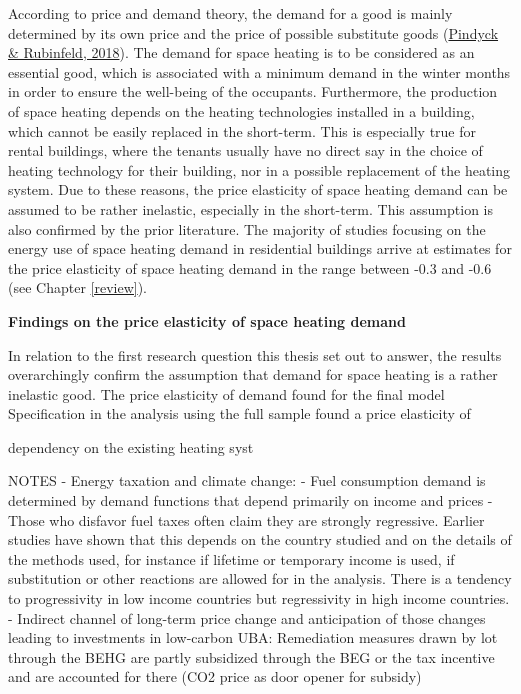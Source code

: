 \documentclass[12pt,twoside]{reedthesis}
\begin{document}
According to price and demand theory, the demand for a good is mainly determined by its own price and the price of possible substitute goods (\protect\hyperlink{ref-pindyck_rubinfeld18}{Pindyck \& Rubinfeld, 2018}). The demand for space heating is to be considered as an essential good, which is associated with a minimum demand in the winter months in order to ensure the well-being of the occupants. Furthermore, the production of space heating depends on the heating technologies installed in a building, which cannot be easily replaced in the short-term. This is especially true for rental buildings, where the tenants usually have no direct say in the choice of heating technology for their building, nor in a possible replacement of the heating system. Due to these reasons, the price elasticity of space heating demand can be assumed to be rather inelastic, especially in the short-term. This assumption is also confirmed by the prior literature. The majority of studies focusing on the energy use of space heating demand in residential buildings arrive at estimates for the price elasticity of space heating demand in the range between -0.3 and -0.6 (see Chapter \ref{review}).

\textbf{Findings on the price elasticity of space heating demand}

In relation to the first research question this thesis set out to answer, the results overarchingly confirm the assumption that demand for space heating is a rather inelastic good. The price elasticity of demand found for the final model Specification in the analysis using the full sample found a price elasticity of

dependency on the existing heating syst

NOTES - Energy taxation and climate change:
- Fuel consumption demand is determined by demand functions that depend primarily on income and prices
- Those who disfavor fuel taxes often claim they are strongly regressive. Earlier studies have shown that this depends on the country studied and on the details of the methods used, for instance if lifetime or temporary income is used, if substitution or other reactions are allowed for in the analysis. There is a tendency to progressivity in low income countries but regressivity in high income countries.
- Indirect channel of long-term price change and anticipation of those changes leading to investments in low-carbon UBA: Remediation measures drawn by lot through the BEHG are partly subsidized through the BEG or the tax incentive and are accounted for there (CO2 price as door opener for subsidy)
\end{document}
